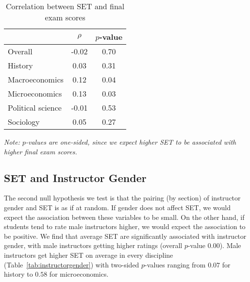 \documentclass[12pt]{article}
\begin{document}
\begin{table}[htbp]
  \centering
  \footnotesize 
  \caption{Correlation between SET and final exam scores}
    \begin{tabular}{lcc}
    \toprule 
                        & $\rho$  & $p$-value  \\
   \midrule
    Overall &            -0.02 &       0.70  \\
    History &             0.03 &       0.31  \\
    Macroeconomics &      0.12 &       0.04  \\
    Microeconomics &      0.13 &       0.03  \\
    Political science &  -0.01 &       0.53  \\
    Sociology &           0.05 &       0.27  \\
    \bottomrule
    \end{tabular}%
 \label{tab:finalexam}%
 
\textit{Note: $p$-values are one-sided, since we expect higher SET to be associated
with higher final exam scores.}
\end{table}%
\normalsize


\subsection{SET and Instructor Gender}
The second null hypothesis we test is that the pairing (by section) of 
instructor gender and SET is as if at random.
If gender does not affect SET, we would expect the association between these
variables to be small.
On the other hand, if students tend to rate male instructors higher, we would
expect the association to be positive.
We find that average SET are significantly associated with instructor gender, with male instructors
getting higher ratings (overall $p$-value 0.00). 
Male instructors get higher SET on average in every discipline  (Table~\ref{tab:instructorgender})
with two-sided $p$-values ranging from $0.07$ for history to $0.58$ for microeconomics.
\end{document}
